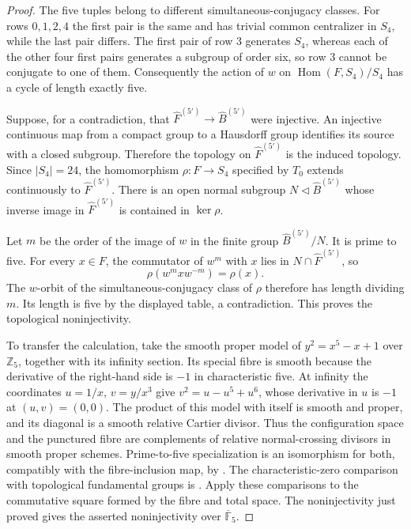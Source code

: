 \begin{proof}
The five tuples belong to different simultaneous-conjugacy classes.
For rows $0,1,2,4$ the first pair is the same and has trivial common
centralizer in $S_4$, while the last pair differs. The first pair of
row $3$ generates $S_4$, whereas each of the other four first pairs
generates a subgroup of order six, so row $3$ cannot be conjugate to
one of them. Consequently the action of $w$ on
$\operatorname{Hom}(F,S_4)/S_4$ has a cycle of length exactly five.

Suppose, for a contradiction, that
$\widehat F^{(5')}\to\widehat B^{(5')}$ were injective. An injective
continuous map from a compact group to a Hausdorff group identifies
its source with a closed subgroup. Therefore the topology on
$\widehat F^{(5')}$ is the induced topology. Since $|S_4|=24$, the
homomorphism $\rho:F\to S_4$ specified by $T_0$ extends continuously
to $\widehat F^{(5')}$. There is an open normal subgroup
$N\triangleleft\widehat B^{(5')}$ whose inverse image in
$\widehat F^{(5')}$ is contained in $\ker\rho$.

Let $m$ be the order of the image of $w$ in the finite group
$\widehat B^{(5')}/N$. It is prime to five. For every $x\in F$, the
commutator of $w^m$ with $x$ lies in $N\cap\widehat F^{(5')}$, so
\[
 \rho(w^m xw^{-m})=\rho(x).
\]
The $w$-orbit of the simultaneous-conjugacy class of $\rho$ therefore
has length dividing $m$. Its length is five by the displayed table,
a contradiction. This proves the topological noninjectivity.

To transfer the calculation, take the smooth proper model of
$y^2=x^5-x+1$ over $\mathbb Z_5$, together with its infinity section.
Its special fibre is smooth because the derivative of the right-hand
side is $-1$ in characteristic five. At infinity the coordinates
$u=1/x$, $v=y/x^3$ give $v^2=u-u^5+u^6$, whose derivative in $u$
is $-1$ at $(u,v)=(0,0)$. The product of this
model with itself is smooth and proper, and its diagonal is a smooth
relative Cartier divisor. Thus the configuration space and the
punctured fibre are complements of relative normal-crossing divisors
in smooth proper schemes. Prime-to-five specialization is an
isomorphism for both, compatibly with the fibre-inclusion map, by
\citet[Expos\'e XIII, Corollary 2.9 and \S2.10]{A_SGA1}.
The characteristic-zero comparison with topological fundamental
groups is \citet[Expos\'e XII, Corollary 5.2]{A_SGA1}. Apply these
comparisons to the commutative square formed by the fibre and total
space. The noninjectivity just proved gives the asserted
noninjectivity over $\overline{\mathbb F}_5$.
\end{proof}

